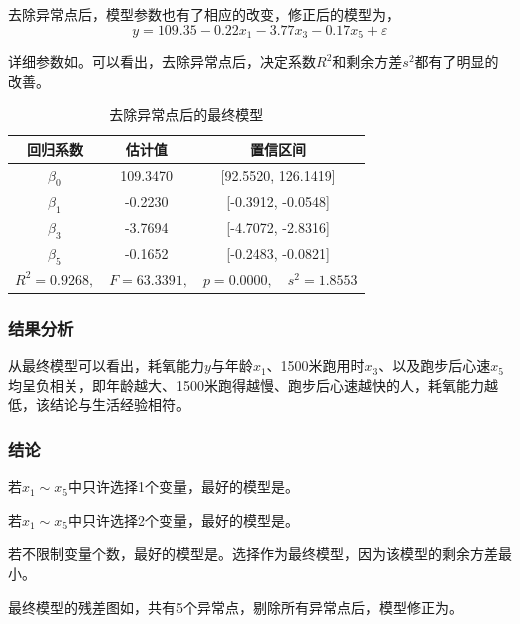 去除异常点后，模型参数也有了相应的改变，修正后的模型为，
\begin{equation}\label{eq:ex7_final_no_outlier}
    y = 109.35 -0.22 x_1 -3.77 x_3 -0.17 x_5 + \varepsilon
\end{equation}

详细参数如。可以看出，去除异常点后，决定系数$R^2$和剩余方差$s^2$都有了明显的改善。

\begin{table}[H]
    \centering
    \caption{去除异常点后的最终模型}
    \label{tab:ex7_final_no_outlier}
    \begin{tabular}{|c|c|c|}
        \hline
        回归系数 & 估计值 & 置信区间\\
        \hline
        \hline
        \(\beta_0\) & 109.3470 & [92.5520, 126.1419]\\
        \hline
        \(\beta_1\) & -0.2230 & [-0.3912, -0.0548]\\
        \hline
        \(\beta_3\) & -3.7694 & [-4.7072, -2.8316]\\
        \hline
        \(\beta_5\) & -0.1652 & [-0.2483, -0.0821]\\
        \hline
        \multicolumn{3}{|c|}{$R^2=0.9268, \quad F=63.3391, \quad p=0.0000, \quad s^2=1.8553$}\\
        \hline
    \end{tabular}
\end{table}

\subsubsection{结果分析}

从最终模型可以看出，耗氧能力$y$与年龄$x_1$、1500米跑用时$x_3$、以及跑步后心速$x_5$均呈负相关，即年龄越大、1500米跑得越慢、跑步后心速越快的人，耗氧能力越低，该结论与生活经验相符。

\subsubsection{结论}

若$x_1 \sim x_5$中只许选择1个变量，最好的模型是。

若$x_1 \sim x_5$中只许选择2个变量，最好的模型是。

若不限制变量个数，最好的模型是。选择作为最终模型，因为该模型的剩余方差最小。

最终模型的残差图如，共有5个异常点，剔除所有异常点后，模型修正为。
